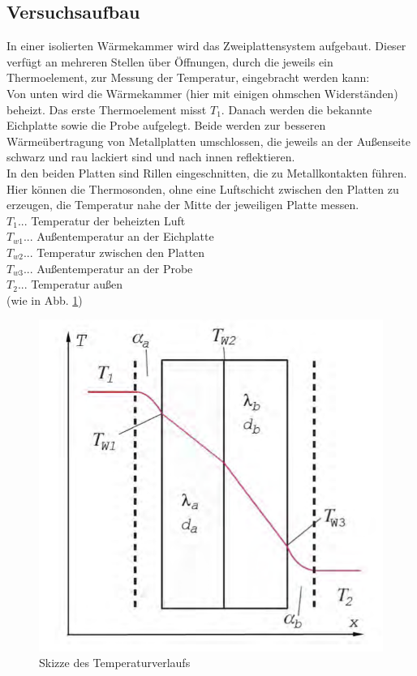 \documentclass[12pt,a4paper]{article}
\begin{document}
\begin{multicols}{2}
\subsection{Versuchsaufbau}
In einer isolierten Wärmekammer wird das Zweiplattensystem aufgebaut. Dieser verfügt an mehreren Stellen über Öffnungen, durch die jeweils ein Thermoelement, zur Messung der Temperatur, eingebracht werden kann:\\
Von unten wird die Wärmekammer (hier mit einigen ohmschen Widerständen) beheizt. Das erste Thermoelement misst $T_1$.
Danach werden die bekannte Eichplatte sowie die Probe aufgelegt. Beide werden zur besseren Wärmeübertragung von Metallplatten umschlossen, die jeweils an der Außenseite schwarz und rau lackiert sind und nach innen reflektieren.\\
In den beiden Platten sind Rillen eingeschnitten, die zu Metallkontakten führen. Hier können die Thermosonden, ohne eine Luftschicht zwischen den Platten zu erzeugen, die Temperatur nahe der Mitte der jeweiligen Platte messen.\\

\noindent  $T_1$... Temperatur der beheizten Luft\\
$T_{w1}$... Außentemperatur an der Eichplatte\\
$T_{w2}$... Temperatur zwischen den Platten\\
$T_{w3}$... Außentemperatur an der Probe\\
$T_2$... Temperatur außen\\
(wie in  Abb. \ref{fig:temp_verlauf})\\

\begin{figure}[H]
	\centering
	\includegraphics[scale=0.8]{./BilderCorrect/PS10_Versuch-2_Skizze.png}
	\caption{Skizze des Temperaturverlaufs}
	\label{fig:temp_verlauf}
\end{figure}


\end{multicols}
\end{document}
